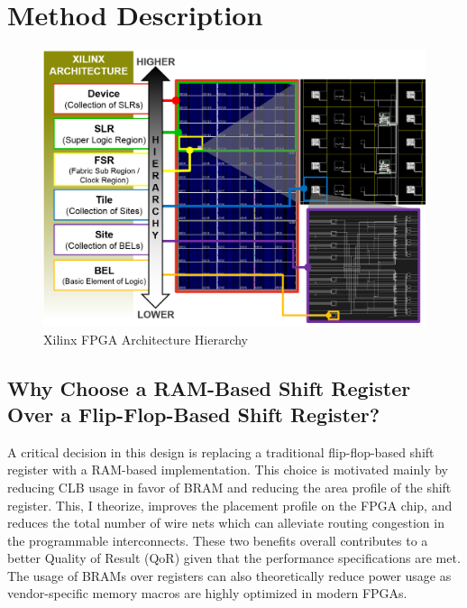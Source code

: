 \documentclass{article}
\begin{document}
\section{Method Description}
    \begin{figure}
        \centering
        \includegraphics[width=1.00\textwidth]{figures/hierarchy.png}
        \caption{Xilinx FPGA Architecture Hierarchy}\label{fig:hierarchy}
    \end{figure}
    \subsection{Why Choose a RAM-Based Shift Register Over a Flip-Flop-Based Shift Register?}
    A critical decision in this design is replacing a traditional flip-flop-based shift register with a RAM-based implementation.
    This choice is motivated mainly by reducing CLB usage in favor of BRAM and reducing the area profile of the shift register.
    This, I theorize, improves the placement profile on the FPGA chip, and reduces the total number of wire nets which can alleviate routing congestion in the programmable interconnects.
    These two benefits overall contributes to a better Quality of Result (QoR) given that the performance specifications are met.
    The usage of BRAMs over registers can also theoretically reduce power usage as vendor-specific memory macros are highly optimized in modern FPGAs.
\end{document}

